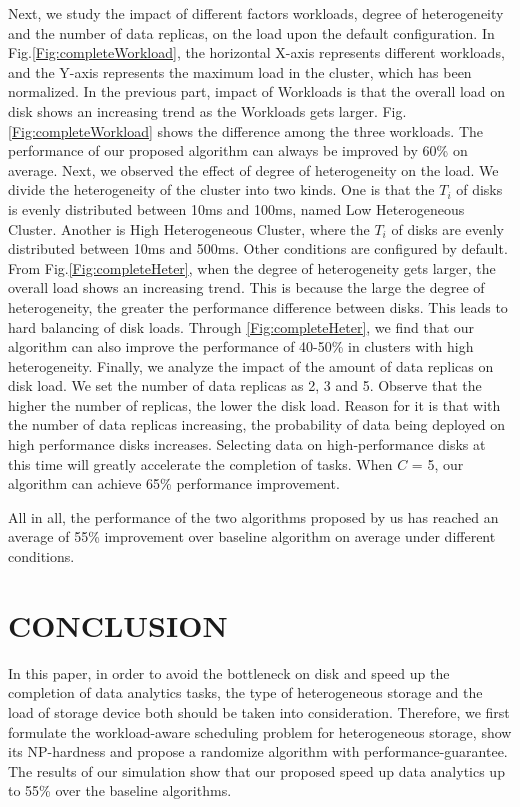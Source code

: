 \documentclass[conference]{IEEEtran}
\begin{document}
Next, we study the impact of different factors workloads, degree of heterogeneity and the number of data replicas, on the load upon the default configuration. In Fig.\ref{Fig:completeWorkload}, the horizontal X-axis represents different workloads, and the Y-axis represents the maximum load in the cluster, which has been normalized. In the previous part, impact of Workloads is that the overall load on disk shows an increasing trend as the Workloads gets larger. Fig.\ref{Fig:completeWorkload} shows the difference among the three workloads. The performance of our proposed algorithm can always be improved by 60\% on average. Next, we observed the effect of degree of heterogeneity on the load. We divide the heterogeneity of the cluster into two kinds. One is that the $T_i$ of disks is evenly distributed between 10ms and 100ms, named Low Heterogeneous Cluster. Another is High Heterogeneous Cluster, where the $T_i$ of disks are evenly distributed between 10ms and 500ms. Other conditions are configured by default. From Fig.\ref{Fig:completeHeter}, when the degree of heterogeneity gets larger, the overall load shows an increasing trend. This is because the large the degree of heterogeneity, the greater the performance difference between disks. This leads to hard balancing of disk loads. Through \ref{Fig:completeHeter}, we find that our algorithm can also improve the performance of 40-50\% in clusters with high heterogeneity. Finally, we analyze the impact of the amount of data replicas on disk load. We set the number of data replicas as 2, 3 and 5. Observe that the higher the number of replicas, the lower the disk load. Reason for it is that with the number of data replicas increasing, the probability of data being deployed on high performance disks increases. Selecting data on high-performance disks at this time will greatly accelerate the completion of tasks. When $C$ = 5, our algorithm can achieve 65\% performance improvement.
 
 All in all,  the performance of the two algorithms proposed by us has reached an average of 55\% improvement over baseline algorithm on average under different conditions.



\section{CONCLUSION}\label{CONCLUSION}
In this paper, in order to avoid the bottleneck on disk and speed up the completion of data analytics tasks, the type of heterogeneous storage and the load of storage device both should be taken into consideration. Therefore, we first formulate the workload-aware scheduling problem for heterogeneous storage, show its NP-hardness and propose a randomize algorithm with performance-guarantee. The results of our simulation show that our proposed speed up data analytics up to 55\% over the baseline algorithms.
\end{document}
